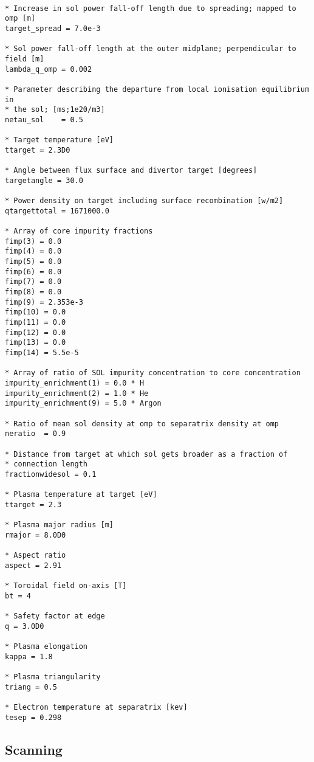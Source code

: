 \documentclass[11pt,a4paper]{report}
\begin{document}
\begin{mdframed}
\begin{verbatim}

* Increase in sol power fall-off length due to spreading; mapped to omp [m]
target_spread = 7.0e-3

* Sol power fall-off length at the outer midplane; perpendicular to field [m]
lambda_q_omp = 0.002

* Parameter describing the departure from local ionisation equilibrium in 
* the sol; [ms;1e20/m3]
netau_sol    = 0.5

* Target temperature [eV]
ttarget = 2.3D0

* Angle between flux surface and divertor target [degrees]
targetangle = 30.0

* Power density on target including surface recombination [w/m2]
qtargettotal = 1671000.0 

* Array of core impurity fractions
fimp(3) = 0.0
fimp(4) = 0.0
fimp(5) = 0.0
fimp(6) = 0.0
fimp(7) = 0.0
fimp(8) = 0.0
fimp(9) = 2.353e-3
fimp(10) = 0.0
fimp(11) = 0.0
fimp(12) = 0.0
fimp(13) = 0.0
fimp(14) = 5.5e-5

* Array of ratio of SOL impurity concentration to core concentration
impurity_enrichment(1) = 0.0 * H
impurity_enrichment(2) = 1.0 * He
impurity_enrichment(9) = 5.0 * Argon

* Ratio of mean sol density at omp to separatrix density at omp
neratio  = 0.9 

* Distance from target at which sol gets broader as a fraction of 
* connection length
fractionwidesol = 0.1

* Plasma temperature at target [eV]
ttarget = 2.3

* Plasma major radius [m]
rmajor = 8.0D0

* Aspect ratio
aspect = 2.91

* Toroidal field on-axis [T]
bt = 4

* Safety factor at edge
q = 3.0D0

* Plasma elongation
kappa = 1.8

* Plasma triangularity
triang = 0.5

* Electron temperature at separatrix [kev]
tesep = 0.298
\end{verbatim}
\end{mdframed}

\subsection{Scanning}
\end{document}
